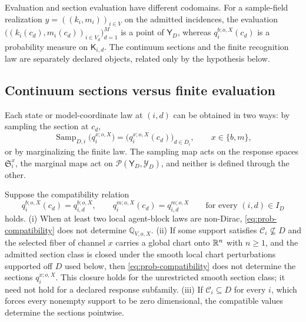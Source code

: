 Evaluation and section evaluation have different codomains. For a sample-field realization
\(y=((k_i,m_i))_{i\in V}\) on the admitted incidences, the evaluation
\(\bigl((k_i(c_d),m_i(c_d))_{i\in V_d}\bigr)_{d=1}^{M}\) is a point of \(\mathsf Y_D\), whereas
\(q_i^{b;o,X}(c_d)\) is a probability measure on \(\mathsf K_{i,d}\). The continuum sections and the
finite recognition law are separately declared objects, related only by the hypothesis below.

\subsection{Continuum sections versus finite evaluation}
\label{sec:prob-compatibility}

Each state or model-coordinate law at \((i,d)\) can be obtained in two ways: by sampling the section
at \(c_d\),
\begin{equation}
\operatorname{Samp}_{D,i}\bigl(q_i^{x;o,X}\bigr)=\bigl(q_i^{x;o,X}(c_d)\bigr)_{d\in D_i},
\qquad x\in\{b,m\},
\label{eq:prob-sampling-map}
\end{equation}
or by marginalizing the finite law. The sampling map acts on the response spaces
\(\mathfrak S_i^x\), the marginal maps act on \(\mathcal P(\mathsf Y_D,\mathscr Y_D)\), and neither is
defined through the other.

Suppose the compatibility relation
\begin{equation}
q_i^{b;o,X}(c_d)=q_{i,d}^{b;o,X},
\qquad
q_i^{m;o,X}(c_d)=q_{i,d}^{m;o,X}
\qquad\text{for every }(i,d)\in I_D
\label{eq:prob-compatibility}
\end{equation}
holds. (i) When at least two local agent-block laws are non-Dirac, \eqref{eq:prob-compatibility}
does not determine \(\mathbb Q_{V,o,X}\). (ii) If some support satisfies
\(\mathcal C_i\not\subseteq D\) and the selected fiber of channel \(x\) carries a global chart onto
\(\mathbb R^n\) with \(n\geq1\), and the admitted section class is closed under the smooth local
chart perturbations supported off \(D\) used below, then \eqref{eq:prob-compatibility} does not
determine the sections \(q_i^{x;o,X}\). This closure holds for the unrestricted smooth section
class; it need not hold for a declared response subfamily. (iii) If \(\mathcal C_i\subseteq D\) for every
\(i\), which forces every nonempty
support to be zero dimensional, the compatible values determine the sections pointwise.


